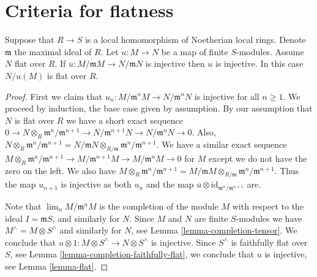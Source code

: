 \section{Criteria for flatness}
\label{section-criteria-flatness}

\begin{lemma}
\label{lemma-mod-injective}
Suppose that $R \to S$ is a local homomorphism of Noetherian
local rings. Denote $\mathfrak m$ the maximal ideal of $R$.
Let $u : M \to N$ be a map of finite $S$-modules.
Assume $N$ flat over $R$.
If $\overline{u} : M/\mathfrak mM \to N/\mathfrak mN$
is injective then $u$ is injective.
In this case $N/u(M)$ is flat over $R$.
\end{lemma}

\begin{proof}
First we claim that $u_n : M/{\mathfrak m}^nM \to N/{\mathfrak m}^nN$
is injective for all $n \geq 1$. We proceed by induction, the base
case given by assumption. By our assumption that $N$ is flat
over $R$ we have  a short exact sequence
$0 \to N\otimes_R {\mathfrak m}^n/{\mathfrak m}^{n + 1}
\to N/{\mathfrak m}^{n + 1}N \to N/{\mathfrak m}^n N\to 0$.
Also, $N\otimes_R {\mathfrak m}^n/{\mathfrak m}^{n + 1}
= N/{\mathfrak m}N \otimes_{R/{\mathfrak m}}
{\mathfrak m}^n/{\mathfrak m}^{n + 1}$. We have
a similar exact sequence $M\otimes_R {\mathfrak m}^n/{\mathfrak m}^{n + 1}
\to M/{\mathfrak m}^{n + 1}M \to M/{\mathfrak m}^n M\to 0$
for $M$ except we do not have the zero on the left. We also
have $M\otimes_R {\mathfrak m}^n/{\mathfrak m}^{n + 1}
= M/{\mathfrak m}M \otimes_{R/{\mathfrak m}}
{\mathfrak m}^n/{\mathfrak m}^{n + 1}$. Thus the map $u_{n + 1}$ is
injective as both $u_n$ and the map
$\overline{u}\otimes \text{id}_{{\mathfrak m}^n/{\mathfrak m}^{n + 1}}$ are.

\medskip\noindent
Note that $\lim_n M/{\mathfrak m}^nM$ is the completion
of the module $M$ with respect to the ideal $I = {\mathfrak m}S$,
and similarly for $N$. Since $M$ and $N$ are finite $S$-modules
we have $M^\wedge = M \otimes S^\wedge$ and similarly for $N$, see Lemma
\ref{lemma-completion-tensor}.
We conclude that
$u \otimes 1 : M \otimes S^\wedge \to N \otimes S^\wedge$
is injective. Since $S^\wedge$ is faithfully
flat over $S$, see Lemma \ref{lemma-completion-faithfully-flat},
we conclude that $u$ is injective, see Lemma \ref{lemma-flat}.


\end{proof}
